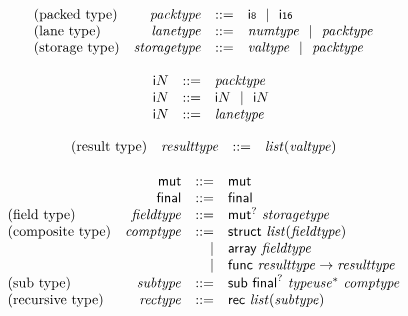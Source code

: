 $$
\begin{array}[t]{@{}lrrl@{}l@{}}
\mbox{(packed type)} & {\mathit{packtype}} & ::= & \mathsf{i{\scriptstyle 8}} ~~|~~ \mathsf{i{\scriptstyle 16}} \\
\mbox{(lane type)} & {\mathit{lanetype}} & ::= & {\mathit{numtype}} ~~|~~ {\mathit{packtype}} \\
\mbox{(storage type)} & {\mathit{storagetype}} & ::= & {\mathit{valtype}} ~~|~~ {\mathit{packtype}} \\
\end{array}
$$

\vspace{1ex}

$$
\begin{array}[t]{@{}lrrl@{}l@{}}
& {\mathsf{i}}{N} & ::= & {\mathit{packtype}} \\
& {\mathsf{i}}{N} & ::= & {\mathsf{i}}{N} ~~|~~ {\mathsf{i}}{N} \\
& {\mathsf{i}}{N} & ::= & {\mathit{lanetype}} \\
\end{array}
$$

\vspace{1ex}

$$
\begin{array}[t]{@{}lrrl@{}l@{}}
\mbox{(result type)} & {\mathit{resulttype}} & ::= & {\mathit{list}}({\mathit{valtype}}) \\
\end{array}
$$

\vspace{1ex}

$$
\begin{array}[t]{@{}lrrl@{}l@{}}
& \mathsf{mut} & ::= & \mathsf{mut} \\
& \mathsf{final} & ::= & \mathsf{final} \\
\mbox{(field type)} & {\mathit{fieldtype}} & ::= & {\mathsf{mut}^?}~{\mathit{storagetype}} \\
\mbox{(composite type)} & {\mathit{comptype}} & ::= & \mathsf{struct}~{\mathit{list}}({\mathit{fieldtype}}) \\
& & | & \mathsf{array}~{\mathit{fieldtype}} \\
& & | & \mathsf{func}~{\mathit{resulttype}} \rightarrow {\mathit{resulttype}} \\
\mbox{(sub type)} & {\mathit{subtype}} & ::= & \mathsf{sub}~{\mathsf{final}^?}~{{\mathit{typeuse}}^\ast}~{\mathit{comptype}} \\
\mbox{(recursive type)} & {\mathit{rectype}} & ::= & \mathsf{rec}~{\mathit{list}}({\mathit{subtype}}) \\
\end{array}
$$

